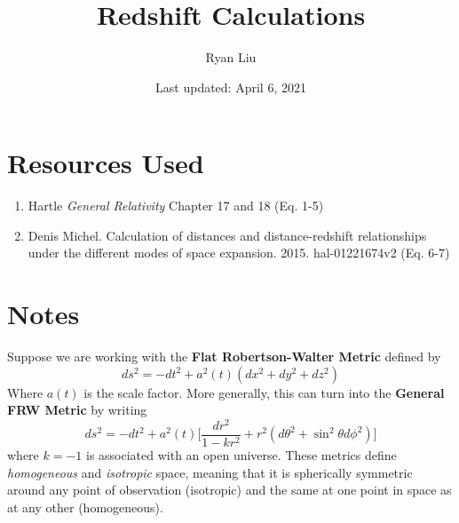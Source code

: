 \documentclass{article}
\title{Redshift Calculations}
\author{Ryan Liu}
\date{Last updated: April 6, 2021}
\begin{document}
\maketitle

\section{Resources Used}

\begin{enumerate}
    \item Hartle \textit{General Relativity} Chapter 17 and 18 (Eq. 1-5)
    \item Denis Michel. Calculation of distances and distance-redshift relationships under the different modes of space expansion. 2015. hal-01221674v2 (Eq. 6-7)
\end{enumerate}

\section{Notes}

Suppose we are working with the \textbf{Flat Robertson-Walter Metric} defined by 
\begin{equation}
    ds^2 = -dt^2 + a^2(t)(dx^2+dy^2+dz^2)
\end{equation}
Where $a(t)$ is the scale factor. More generally, this can turn into the \textbf{General FRW Metric} by writing 
\begin{equation}
    ds^2 = -dt^2 + a^2(t) \Big[ \frac{dr^2}{1-kr^2} + r^2(d\theta^2 + \sin^2 \theta d\phi^2)\Big]
\end{equation}
where $k=-1$ is associated with an open universe. These metrics define \textit{homogeneous} and \textit{isotropic} space, meaning that it is spherically symmetric around any point of observation (isotropic) and the same at one point in space as at any other (homogeneous). \\
\end{document}
